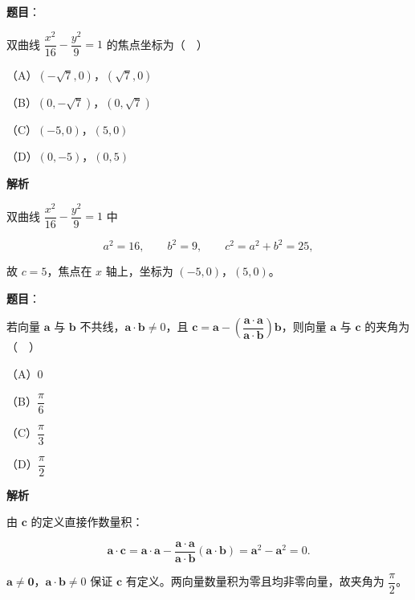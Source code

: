 \begin{answer}

\textbf{题目}：

双曲线 $\dfrac{x^2}{16}-\dfrac{y^2}{9}=1$ 的焦点坐标为（　）

（A）$(-\sqrt7,0)$，$(\sqrt7,0)$

（B）$(0,-\sqrt7)$，$(0,\sqrt7)$

（C）$(-5,0)$，$(5,0)$

（D）$(0,-5)$，$(0,5)$

\textbf{解析}

双曲线 $\dfrac{x^2}{16}-\dfrac{y^2}{9}=1$ 中

\nopagebreak[4]
\[a^2=16,\qquad b^2=9,\qquad c^2=a^2+b^2=25,\]

故 $c=5$，焦点在 $x$ 轴上，坐标为 $(-5,0)$，$(5,0)$。


\end{answer}
\begin{answer}

\textbf{题目}：

若向量 $\boldsymbol a$ 与 $\boldsymbol b$ 不共线，$\boldsymbol a\cdot\boldsymbol b\neq0$，且 $\boldsymbol c=\boldsymbol a-\left(\dfrac{\boldsymbol a\cdot\boldsymbol a}{\boldsymbol a\cdot\boldsymbol b}\right)\boldsymbol b$，则向量 $\boldsymbol a$ 与 $\boldsymbol c$ 的夹角为（　）

（A）$0$

（B）$\dfrac{\pi}{6}$

（C）$\dfrac{\pi}{3}$

（D）$\dfrac{\pi}{2}$

\textbf{解析}

由 $\boldsymbol c$ 的定义直接作数量积：

\nopagebreak[4]
\[\boldsymbol a\cdot\boldsymbol c=\boldsymbol a\cdot\boldsymbol a-\frac{\boldsymbol a\cdot\boldsymbol a}{\boldsymbol a\cdot\boldsymbol b}(\boldsymbol a\cdot\boldsymbol b)=\boldsymbol a^2-\boldsymbol a^2=0.\]

$\boldsymbol a\neq\boldsymbol 0$，$\boldsymbol a\cdot\boldsymbol b\neq0$ 保证 $\boldsymbol c$ 有定义。两向量数量积为零且均非零向量，故夹角为 $\dfrac{\pi}{2}$。


\end{answer}
